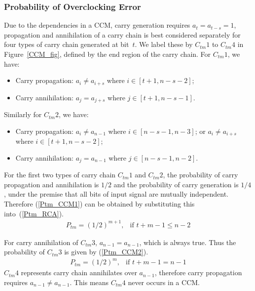 \documentclass[journal]{IEEEtran}
\begin{document}
\subsubsection{Probability of Overclocking Error}
Due to the dependencies in a CCM, carry generation requires $a_t=a_{t-s}=1$, propagation and annihilation of a carry chain is best considered separately for four types of carry chain generated at bit~$t$. We label these by $C_{tm}1$ to $C_{tm}4$ in Figure~\ref{CCM_fig}, defined by the end region of the carry chain. For $C_{tm}1$, we have:
\begin{itemize}
  \item Carry propagation: $\!a_i\neq\!a_{i+s}\!$ where $\!i\!\in[t+1,n-s-2]\!$;
  \item Carry annihilation: $\!a_j\!=\!a_{j+s}\!$ where $\!j\!\in[t+1,n-s-1]\!$.
\end{itemize}
Similarly for $C_{tm}2$, we have:
\begin{itemize}
  \item Carry propagation: $a_i\neq a_{n-1}$ where $i\in[n-s-1,n-3]$; or $a_i\neq a_{i+s}$ where $i\in[t+1,n-s-2]$;
  \item Carry annihilation: $\!a_j\!=a_{n-1}\!$ where $j\!\in\![n-s-1,n-2]$.
\end{itemize}

For the first two types of carry chain $C_{tm}1$ and $C_{tm}2$, the probability of carry propagation and annihilation is $1/2$ and the probability of carry generation is $1/4$, under the premise that all bits of input signal are mutually independent. Therefore (\ref{Ptm_CCM1}) can be obtained by substituting this into~(\ref{Ptm_RCA}).
%
\begin{eqnarray}\label{Ptm_CCM1}
  P_{tm}=\left(1/2\right)^{m+1}, & \textrm{if $t+m-1\leqslant n-2$}
\end{eqnarray}

For carry annihilation of $C_{tm}3$, $a_{n-1}=a_{n-1}$, which is always true. Thus the probability of $C_{tm}3$ is given by (\ref{Ptm_CCM2}).
%
\begin{eqnarray}\label{Ptm_CCM2}
  P_{tm}=\left(1/2\right)^m, & \textrm{if $t+m-1=n-1$}
\end{eqnarray}
$C_{tm}4$ represents carry chain annihilates over $a_{n-1}$, therefore carry propagation requires $a_{n-1}\neq a_{n-1}$. This means $C_{tm}4$ never occurs in a CCM.
\end{document}
